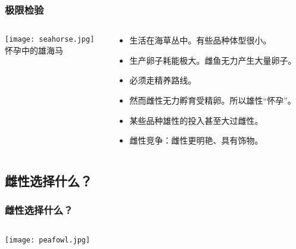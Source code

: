 \documentclass[UTF8,lualatex]{ctexbeamer}
\begin{document}
\begin{frame}
    \frametitle{极限检验}
    \begin{columns}
        \begin{column}{.48\textwidth}
            \begin{center}
                \texttt{[image: seahorse.jpg]}
                \\
                \small
                怀孕中的雄海马
            \end{center}
        \end{column}
        \begin{column}{.48\textwidth}
            \begin{itemize}
                \item 生活在海草丛中。有些品种体型很小。
                \item 生产卵子耗能极大。雌鱼无力产生大量卵子。
                \item 必须走精养路线。
                \item 然而雌性无力孵育受精卵。所以雄性“怀孕”。
                \item 某些品种雄性的投入甚至大过雌性。
                \item<2> 雌性竞争：雌性更明艳、具有饰物。
            \end{itemize}
        \end{column}
    \end{columns}
\end{frame}

\subsection{雌性选择什么？}

\begin{frame}
    \frametitle{雌性选择什么？}
    \begin{columns}
        \begin{column}{.48\textwidth}
            \texttt{[image: peafowl.jpg]}
        \end{column}
    \end{columns}
\end{frame}
\end{document}
